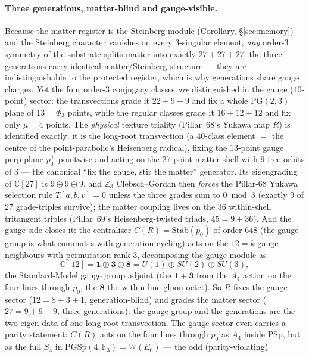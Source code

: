 \documentclass[11pt]{article}
\newcommand{\GF}[1]{\mathbb{F}_{#1}}
\newcommand{\PSp}{\mathrm{PSp}}
\begin{document}
\paragraph{Three generations, matter-blind and gauge-visible.}
Because the matter register is the Steinberg module
(Corollary, \S\ref{sec:memory}) and the Steinberg character vanishes
on every $3$-singular element, \emph{any} order-$3$ symmetry of the
substrate splits matter into exactly $27+27+27$: the three
generations carry identical matter/Steinberg structure --- they are
indistinguishable to the protected register, which is why generations
share gauge charges.  Yet the four order-$3$ conjugacy classes
\emph{are} distinguished in the gauge ($40$-point) sector: the
transvections grade it $22+9+9$ and fix a whole $\mathrm{PG}(2,3)$
plane of $13=\Phi_3$ points, while the regular classes grade it
$16+12+12$ and fix only $\mu=4$ points.  The \emph{physical} texture
triality (Pillar~68's Yukawa map $R$) is identified exactly: it is
the long-root transvection (a $40$-class element $=$ the centre of
the point-parabolic's Heisenberg radical), fixing the $13$-point
gauge perp-plane $p_0^\perp$ pointwise and acting on the $27$-point
matter shell with $9$ free orbits of $3$ --- the canonical
``fix the gauge, stir the matter'' generator.  Its eigengrading of
$\mathbb{C}[27]$ is $9\oplus9\oplus9$, and $\mathbb{Z}_3$
Clebsch--Gordan then \emph{forces} the Pillar-68 Yukawa selection
rule $T[a,b,v]=0$ unless the three grades sum to $0\bmod3$ (exactly
$9$ of $27$ grade-triples survive); the matter coupling lives on the
$36$ within-shell tritangent triples (Pillar~69's Heisenberg-twisted
triads, $45=9+36$).  And the gauge side closes it: the centralizer
$C(R)=\mathrm{Stab}(p_0)$ of order $648$ (the gauge group is what
commutes with generation-cycling) acts on the $12=k$ gauge neighbours
with permutation rank $3$, decomposing the gauge module as
\[
\mathbb{C}[12]=\mathbf{1}\oplus\mathbf{3}\oplus\mathbf{8}
=U(1)\oplus SU(2)\oplus SU(3),
\]
the Standard-Model gauge group adjoint (the $\mathbf{1}{+}\mathbf{3}$
from the $A_4$ action on the four lines through $p_0$, the
$\mathbf{8}$ the within-line gluon octet).  So $R$ fixes the gauge
sector ($12=8{+}3{+}1$, generation-blind) and grades the matter
sector ($27=9{+}9{+}9$, three generations): the gauge group and the
generations are the two eigen-data of one long-root transvection.
The gauge sector even carries a parity statement: $C(R)$ acts on the
four lines through $p_0$ as $A_4$ inside $\PSp$, but as the full
$S_4$ in $\mathrm{PGSp}(4,\GF3)=W(E_6)$ --- the odd (parity-violating)
\end{document}
